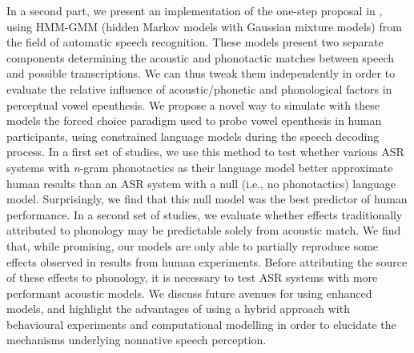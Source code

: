 \documentclass[12pt, twoside]{report}
\begin{document}
In a second part, we present an implementation of the one-step proposal in \cite{wilson2013}, using HMM-GMM (hidden Markov models with Gaussian mixture models) from the field of automatic speech recognition. These models present two separate components determining the acoustic and phonotactic matches between speech and possible transcriptions. We can thus tweak them independently in order to evaluate the relative influence of acoustic/phonetic and phonological factors in perceptual vowel epenthesis. We propose a novel way to simulate with these models the forced choice paradigm used to probe vowel epenthesis in human participants, using constrained language models during the speech decoding process.
In a first set of studies, we use this method to test whether various ASR systems with \textit{n}-gram phonotactics as their language model better approximate human results than an ASR system with a null (i.e., no phonotactics) language model. Surprisingly, we find that this null model was the best predictor of human performance. 
In a second set of studies, we evaluate whether effects traditionally attributed to phonology may be predictable solely from acoustic match. We find that, while promising, our models are only able to partially reproduce some effects observed in results from human experiments. Before attributing the source of these effects to phonology, it is necessary to test ASR systems with more performant acoustic models. We discuss future avenues for using enhanced models, and highlight the advantages of using a hybrid approach with behavioural experiments and computational modelling in order to elucidate the mechanisms underlying nonnative speech perception.     
\end{document}
